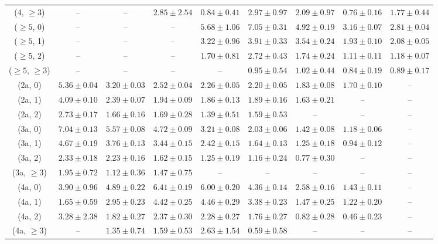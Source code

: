 \begin{table}[h!]
{\begin{tabular}{ccccccccc}
	(4, $\ge3$) & -- & -- & $2.85\pm 2.54$ & $0.84\pm 0.41$ & $2.97\pm 0.97$ & $2.09\pm 0.97$ & $0.76\pm 0.16$ & $1.77\pm 0.44$ \\[0.5ex] 
	($\ge5$, 0) & -- & -- & -- & $5.68\pm 1.06$ & $7.05\pm 0.31$ & $4.92\pm 0.19$ & $3.16\pm 0.07$ & $2.81\pm 0.04$ \\[0.5ex] 
	($\ge5$, 1) & -- & -- & -- & $3.22\pm 0.96$ & $3.91\pm 0.33$ & $3.54\pm 0.24$ & $1.93\pm 0.10$ & $2.08\pm 0.05$ \\[0.5ex] 
	($\ge5$, 2) & -- & -- & -- & $1.70\pm 0.81$ & $2.72\pm 0.43$ & $1.74\pm 0.24$ & $1.11\pm 0.11$ & $1.18\pm 0.07$ \\[0.5ex] 
	($\ge5$, $\ge3$) & -- & -- & -- & -- & $0.95\pm 0.54$ & $1.02\pm 0.44$ & $0.84\pm 0.19$ & $0.89\pm 0.17$ \\[0.5ex] 
	(2a, 0) & $5.36\pm 0.04$ & $3.20\pm 0.03$ & $2.52\pm 0.04$ & $2.26\pm 0.05$ & $2.20\pm 0.05$ & $1.83\pm 0.08$ & $1.70\pm 0.10$ & -- \\[0.5ex] 
	(2a, 1) & $4.09\pm 0.10$ & $2.39\pm 0.07$ & $1.94\pm 0.09$ & $1.86\pm 0.13$ & $1.89\pm 0.16$ & $1.63\pm 0.21$ & -- & -- \\[0.5ex] 
	(2a, 2) & $2.73\pm 0.17$ & $1.66\pm 0.16$ & $1.69\pm 0.28$ & $1.39\pm 0.51$ & $1.59\pm 0.53$ & -- & -- & -- \\[0.5ex] 
	(3a, 0) & $7.04\pm 0.13$ & $5.57\pm 0.08$ & $4.72\pm 0.09$ & $3.21\pm 0.08$ & $2.03\pm 0.06$ & $1.42\pm 0.08$ & $1.18\pm 0.06$ & -- \\[0.5ex] 
	(3a, 1) & $4.67\pm 0.19$ & $3.76\pm 0.13$ & $3.44\pm 0.15$ & $2.42\pm 0.15$ & $1.64\pm 0.13$ & $1.25\pm 0.18$ & $0.94\pm 0.12$ & -- \\[0.5ex] 
	(3a, 2) & $2.33\pm 0.18$ & $2.23\pm 0.16$ & $1.62\pm 0.15$ & $1.25\pm 0.19$ & $1.16\pm 0.24$ & $0.77\pm 0.30$ & -- & -- \\[0.5ex] 
	(3a, $\ge3$) & $1.95\pm 0.72$ & $1.12\pm 0.36$ & $1.47\pm 0.75$ & -- & -- & -- & -- & -- \\[0.5ex] 
	(4a, 0) & $3.90\pm 0.96$ & $4.89\pm 0.22$ & $6.41\pm 0.19$ & $6.00\pm 0.20$ & $4.36\pm 0.14$ & $2.58\pm 0.16$ & $1.43\pm 0.11$ & -- \\[0.5ex] 
	(4a, 1) & $1.65\pm 0.59$ & $2.95\pm 0.23$ & $4.42\pm 0.25$ & $4.46\pm 0.29$ & $3.38\pm 0.23$ & $1.47\pm 0.25$ & $1.22\pm 0.20$ & -- \\[0.5ex] 
	(4a, 2) & $3.28\pm 2.38$ & $1.82\pm 0.27$ & $2.37\pm 0.30$ & $2.28\pm 0.27$ & $1.76\pm 0.27$ & $0.82\pm 0.28$ & $0.46\pm 0.23$ & -- \\[0.5ex] 
	(4a, $\ge3$) & -- & $1.35\pm 0.74$ & $1.59\pm 0.53$ & $2.63\pm 1.54$ & $0.59\pm 0.58$ & -- & -- & -- \\[0.5ex] 

\end{tabular}}
\end{table}
